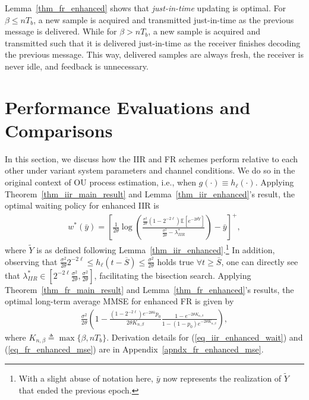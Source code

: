 \documentclass[12pt,journal,onecolumn]{IEEEtran}
\begin{document}
Lemma~\ref{thm_fr_enhanced} shows that {\it just-in-time} updating is optimal. For $\beta\leq nT_b$, a new sample is acquired and transmitted just-in-time as the previous message is delivered. While for $\beta>nT_b$, a new sample is acquired and transmitted such that it is delivered just-in-time as the receiver finishes decoding the previous message. This way, delivered samples are always fresh, the receiver is never idle, and feedback is unnecessary.



\section{Performance Evaluations and Comparisons} \label{sec_cmpr_iir_fr}

In this section, we discuss how the IIR and FR schemes perform relative to each other under variant system parameters and channel conditions. We do so in the original context of OU process estimation, i.e., when $g(\cdot)\equiv h_\ell(\cdot)$. Applying Theorem~\ref{thm_iir_main_result} and Lemma~\ref{thm_iir_enhanced}'s result, the optimal waiting policy for enhanced IIR is
\begin{align} \label{eq_iir_enhanced_wait}
w^*\!\left(\bar{y}\right)\!=\!\left[\frac{1}{2\theta}\log\left(\frac{\frac{\sigma^2}{2\theta}\left(1-2^{-2\ell}\right)\mathbb{E}\left[e^{-2\theta \tilde{Y}}\right]}{\frac{\sigma^2}{2\theta}-\lambda^*_{IIR}}\right)-\bar{y}\right]^+,
\end{align}
where $\tilde{Y}$ is as defined following Lemma~\ref{thm_iir_enhanced}.\footnote{With a slight abuse of notation here, $\bar{y}$ now represents the realization of $\tilde{Y}$ that ended the previous epoch.} In addition, observing that $\frac{\sigma^2}{2\theta}2^{-2\ell}\leq h_{\ell}\left(t-\overline{S}\right)\leq\frac{\sigma^2}{2\theta}$ holds true $\forall t\geq\overline{S}$, one can directly see that $\lambda^*_{IIR}\in\left[2^{-2\ell}\frac{\sigma^2}{2\theta},\frac{\sigma^2}{2\theta}\right]$, facilitating the bisection search. Applying Theorem~\ref{thm_fr_main_result} and Lemma~\ref{thm_fr_enhanced}'s results, the optimal long-term average MMSE for enhanced FR is given by
\begin{align} \label{eq_fr_enhanced_mse}
\frac{\sigma^2}{2\theta}\left(\!1\!-\!\frac{\left(1-2^{-2\ell}\right)e^{-2\theta\bar{n}}p_0}{2\theta K_{n,\beta}}\frac{1-e^{-2\theta K_{n,\beta}}}{1\!-\!(1-p_0)e^{-2\theta K_{n,\beta}}}\right),
\end{align}
where $K_{n,\beta}\triangleq\max\{\beta,nT_b\}$. Derivation details for (\ref{eq_iir_enhanced_wait}) and (\ref{eq_fr_enhanced_mse}) are in Appendix~\ref{apndx_fr_enhanced_mse}.
\end{document}
